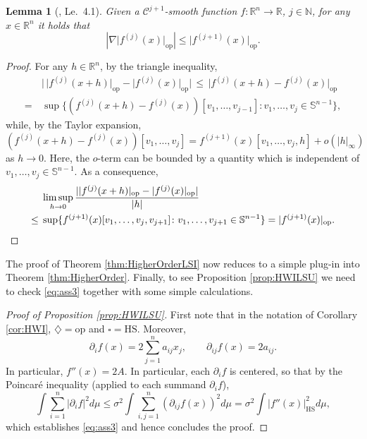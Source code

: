 \documentclass[a4paper,12pt]{amsart}
\numberwithin{equation}{section}
\newtheorem{lemma}[satz]{Lemma}
\theoremstyle{remark}
\def\R{{\mathbb R}}
\def\S{{\mathbb S}}
\begin{document}
\begin{lemma}[\cite{BGS19}, Le.\ 4.1]
	\label{lem:itGradHessLSI}
	Given a $\mathcal{C}^{j+1}$-smooth function $f \colon \R^n \to \mathbb{R}$, $j \in \mathbb{N}$, for any $x \in \R^n$ it holds that
	\[
	|\nabla \lvert f^{(j)}(x) \rvert_{\mathrm{op}}| \le 
	\lvert f^{(j+1)}(x) \rvert_{\mathrm{op}}.
	\]
\end{lemma}

\begin{proof} For any $h \in \mathbb{R}^n$, by the triangle inequality,
	\begin{align*}
		& 
		\big|\,\lvert f^{(j)}(x+h) \rvert_{\mathrm{op}} - 
		\lvert f^{(j)}(x) \rvert_{\mathrm{op}}\big|
		\, \le \,
		\lvert f^{(j)}(x+h) - f^{(j)}(x) \rvert_{\mathrm{op}}\\
		= \, &
		\sup \{ (f^{(j)}(x+h) - f^{(j)}(x))[v_1, \ldots, v_{j-1}] 
		\colon v_1, \ldots, v_j \in \S^{n-1} \},
	\end{align*}
	while, by the Taylor expansion,
	$$
	(f^{(j)}(x+h) - f^{(j)}(x))[v_1, \ldots, v_j] = 
	f^{(j+1)}(x)[v_1, \ldots, v_j, h] + o(|h|_\infty)
	$$
	as $h \to 0$. Here, the $o$-term can be bounded by a quantity which is 
	independent of $v_1, \ldots, v_j \in \S^{n-1}$. As a consequence,
	\begin{align*}
		&
		\limsup_{h \to 0} 
		\frac{|\lvert f^{(j)}(x+h) \rvert_{\mathrm{op}} - \lvert f^{(j)}(x) \rvert_{\mathrm{op}}|}{|h|}\\
		\le \; &\sup \{ f^{(j+1)}(x)[v_1, \ldots, v_j, v_{j+1}] \colon v_1, \ldots, v_{j+1} \in \S^{n-1}\}
		= \lvert f^{(j+1)}(x) \rvert_{\mathrm{op}}.\qedhere
	\end{align*}
\end{proof}

The proof of Theorem \ref{thm:HigherOrderLSI} now reduces to a simple plug-in into Theorem \ref{thm:HigherOrder}. Finally, to see Proposition \ref{prop:HWILSU} we need to check \eqref{eq:ass3} together with some simple calculations.

\begin{proof}[Proof of Proposition \ref{prop:HWILSU}]
First note that in the notation of Corollary \ref{cor:HWI}, $\diamondsuit = \mathrm{op}$ and $\square = \mathrm{HS}$. Moreover,
    \[
    \partial_i f(x) = 2\sum_{j=1}^n a_{ij}x_j, \qquad \partial_{ij} f(x) = 2a_{ij}.
    \]
    In particular, $f''(x) = 2A$. In particular, each $\partial_i f$ is centered, so that by the Poincar\'{e} inequality (applied to each summand $\partial_i f$),
    \[
    \int \sum_{i=1} ^n |\partial_i f|^2 d\mu \le \sigma^2 \int \sum_{i,j=1}^n (\partial_{ij}f(x))^2 d\mu = \sigma^2 \int \lvert f''(x) \rvert_\mathrm{HS}^2 d\mu,
    \]
    which establishes \eqref{eq:ass3} and hence concludes the proof.
\end{proof}
\end{document}
